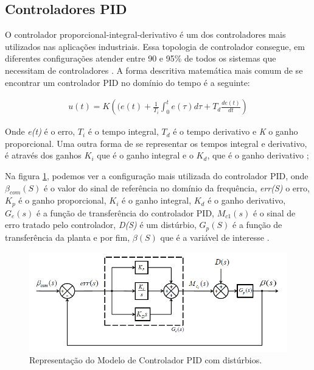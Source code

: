 \subsection{Controladores PID}

O controlador proporcional-integral-derivativo é um dos controladores mais utilizados nas aplicações industriais. Essa topologia de controlador consegue, em diferentes configurações atender entre 90 e 95\% de todos os sistemas que necessitam de controladores \cite{Levine1996}. A forma descritiva matemática mais comum de se encontrar um controlador PID no domínio do tempo é a seguinte:

\begin{gather}
  u(t) = K\left((e(t)+\frac{1}{T_i}\int_{0}^{t}{e(\tau)}d\tau+T_d\frac{de(t)}{dt}\right) 
\end{gather}

Onde \textit{e(t)} é o erro, \textit{$T_i$} é o tempo integral, \textit{$T_d$} é o tempo derivativo e \textit{K} o ganho proporcional. Uma outra forma de se representar os tempos integral e derivativo, é através dos ganhos \textit{$K_i$} que é o ganho integral e o \textit{$K_d$}, que é o ganho derivativo \cite{Astrom1995};


Na figura \ref{fig:pid_controller_Snider_p35}, podemos ver a configuração mais utilizada do controlador PID, onde $\beta_{com}(S)$ é o valor do sinal de referência no domínio da frequência, \textit{err(S)} o erro, \textit{$K_p$} é o ganho proporcional, \textit{$K_i$} é o ganho integral, \textit{$K_d$} é o ganho derivativo, \textit{$G_e(s)$} é a função de transferência do controlador PID, \textit{$M_{c1}(s)$} é o sinal de erro tratado pelo controlador, \textit{D(S)} é um distúrbio, \textit{$G_p(S)$} é a função de transferência da planta e por fim, \textit{$\beta(S)$} que é a variável de interesse \cite{Snider}.

\begin{figure}[h!]
  \caption{Representação do Modelo de Controlador PID com distúrbios.}
  \begin{center}
      \includegraphics[scale=0.75]{img/pid_controller_Snider_p35}
  \end{center}
  \label{fig:pid_controller_Snider_p35}
\end{figure}

